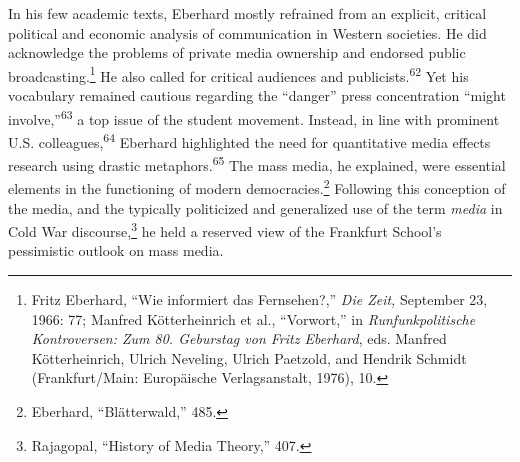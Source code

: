 \documentclass{tufte-handout}
\begin{document}
In his few academic texts, Eberhard mostly refrained from an explicit,
critical political and economic analysis of communication in Western
societies. He did acknowledge the problems of private media ownership
and endorsed public broadcasting.\footnote{Fritz Eberhard, ``Wie
  informiert das Fernsehen?,'' \emph{Die Zeit,} September 23, 1966: 77;
  Manfred Kötterheinrich et al., ``Vorwort,'' in \emph{Runfunkpolitische
  Kontroversen: Zum 80. Geburstag von Fritz Eberhard}, eds. Manfred
  Kötterheinrich, Ulrich Neveling, Ulrich Paetzold, and Hendrik Schmidt
  (Frankfurt/Main: Europäische Verlagsanstalt, 1976), 10.} He also
called for critical audiences and publicists.\textsuperscript{62} Yet his vocabulary remained cautious regarding the
``danger'' press concentration ``might involve,''\textsuperscript{63} a top issue of the student movement. Instead, in line with
prominent U.S. colleagues,\textsuperscript{64}
Eberhard highlighted the need for quantitative media effects research
using drastic metaphors.\textsuperscript{65} The
mass media,
\newpage 
\noindent he explained, were essential elements in the functioning of
modern democracies.\footnote{Eberhard, ``Blätterwald,'' 485.} Following
this conception of the media, and the typically politicized and
generalized use of the term \emph{media} in Cold War
discourse,\footnote{Rajagopal, ``History of Media Theory,'' 407.} he
held a reserved view of the Frankfurt School's pessimistic outlook on
mass media.
\end{document}
